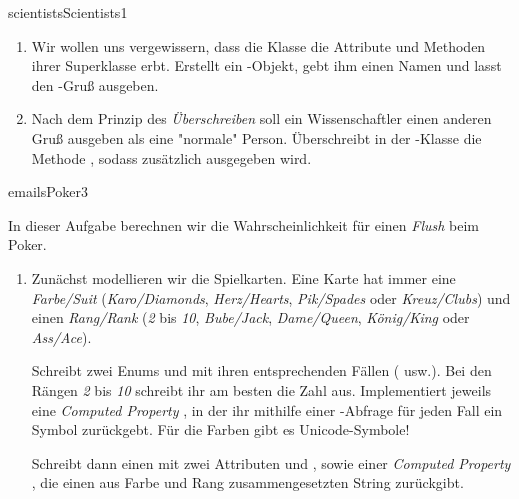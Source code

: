\documentclass[parskip=half, final]{scrreprt}
\begin{document}
\begin{lecture}
\begin{exc}
\begin{excitem}{scientists}{Scientists}{1}
\begin{enumerate}
\begin{hinweis}
Wie in \emph{The Swift Programming Language} beschrieben, erbt eine Subklasse die Attribute und Methoden ihrer Superklasse und kann diese überschreiben:
\begin{swiftcode}
class Scientist: Person {
    ...
}	
\end{swiftcode}
\end{hinweis}

\item Wir wollen uns vergewissern, dass die Klasse  die Attribute und Methoden ihrer Superklasse  erbt. Erstellt ein -Objekt, gebt ihm einen Namen und lasst den -Gruß ausgeben.
\item Nach dem Prinzip des \emph{Überschreiben} soll ein Wissenschaftler einen anderen Gruß ausgeben als eine "{}normale"{} Person. Überschreibt in der -Klasse die Methode , sodass zusätzlich  ausgegeben wird.
\end{enumerate}

\end{excitem}

\begin{excitem}{emails}{Poker}{3}

In dieser Aufgabe berechnen wir die Wahrscheinlichkeit für einen \emph{Flush} beim Poker.

\begin{enumerate}

\item Zunächst modellieren wir die Spielkarten. Eine Karte hat immer eine \emph{Farbe/Suit} (\emph{Karo/Diamonds}, \emph{Herz/Hearts}, \emph{Pik/Spades} oder \emph{Kreuz/Clubs}) und einen \emph{Rang/Rank} (\emph{2} bis \emph{10}, \emph{Bube/Jack}, \emph{Dame/Queen}, \emph{König/King} oder \emph{Ass/Ace}).

	Schreibt zwei Enums  und  mit ihren entsprechenden Fällen ( usw.). Bei den Rängen \emph{2} bis \emph{10} schreibt ihr am besten die Zahl aus. Implementiert jeweils eine \emph{Computed Property} , in der ihr mithilfe einer -Abfrage für jeden Fall ein Symbol zurückgebt.  Für die Farben gibt es Unicode-Symbole!
	
	Schreibt dann einen  mit zwei Attributen  und , sowie einer \emph{Computed Property} , die einen aus Farbe und Rang zusammengesetzten String zurückgibt.
		

\end{enumerate}
\end{excitem}
\end{exc}
\end{lecture}
\end{document}
